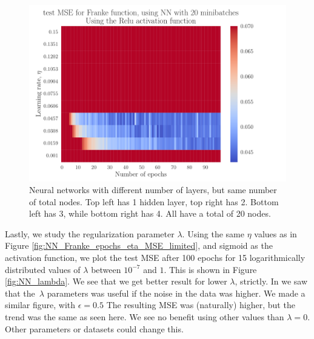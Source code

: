 \documentclass[12pt]{extarticle}
\begin{document}
\begin{figure}[h]
	\endminipage\hfill
	\includegraphics[width=\linewidth]{../output/plots/NN_Franke__epochs_eta__test_MSE__relu__704482.pdf}
	\endminipage
	\caption{Neural networks with different number of layers, but same number of total nodes. Top left has 1 hidden layer, top right has 2. Bottom left has 3, while bottom right has 4. All have a total of 20 nodes.}\label{fig:NN_layers}
\end{figure}

Lastly, we study the regularization parameter $\lambda$. Using the same $\eta$ values as in Figure \ref{fig:NN_Franke_epochs_eta_MSE_limited}, and sigmoid as the activation function, we plot the test MSE after 100 epochs for 15 logarithmically distributed values of $\lambda$ between $10^{-7}$ and $1$. This is shown in Figure \ref{fig:NN_lambda}. We see that we get better result for lower $\lambda$, strictly. In \cite{project1} we saw that the $\lambda$ parameters was useful if the noise in the data was higher. We made a similar figure, with $\epsilon=0.5$ The resulting MSE was (naturally) higher, but the trend was the same as seen here. We see no benefit using other values than $\lambda=0$. Other parameters or datasets could change this.
\end{document}
